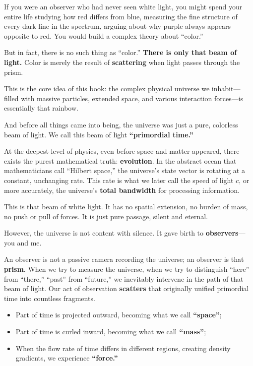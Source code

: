 \documentclass[11pt,a4paper,twoside]{book}
\begin{document}
If you were an observer who had never seen white light, you might spend your entire life studying how red differs from blue, measuring the fine structure of every dark line in the spectrum, arguing about why purple always appears opposite to red. You would build a complex theory about ``color.''

But in fact, there is no such thing as ``color.'' \textbf{There is only that beam of light.} Color is merely the result of \textbf{scattering} when light passes through the prism.

This is the core idea of this book: the complex physical universe we inhabit---filled with massive particles, extended space, and various interaction forces---is essentially that rainbow.

And before all things came into being, the universe was just a pure, colorless beam of light. We call this beam of light \textbf{``primordial time.''}

At the deepest level of physics, even before space and matter appeared, there exists the purest mathematical truth: \textbf{evolution}. In the abstract ocean that mathematicians call ``Hilbert space,'' the universe's state vector is rotating at a constant, unchanging rate. This rate is what we later call the speed of light $c$, or more accurately, the universe's \textbf{total bandwidth} for processing information.

This is that beam of white light. It has no spatial extension, no burden of mass, no push or pull of forces. It is just pure passage, silent and eternal.

However, the universe is not content with silence. It gave birth to \textbf{observers}---you and me.

An observer is not a passive camera recording the universe; an observer is that \textbf{prism}. When we try to measure the universe, when we try to distinguish ``here'' from ``there,'' ``past'' from ``future,'' we inevitably intervene in the path of that beam of light. Our act of observation \textbf{scatters} that originally unified primordial time into countless fragments.

\begin{itemize}
\item Part of time is projected outward, becoming what we call \textbf{``space''};

\item Part of time is curled inward, becoming what we call \textbf{``mass''};

\item When the flow rate of time differs in different regions, creating density gradients, we experience \textbf{``force.''}
\end{itemize}
\end{document}
